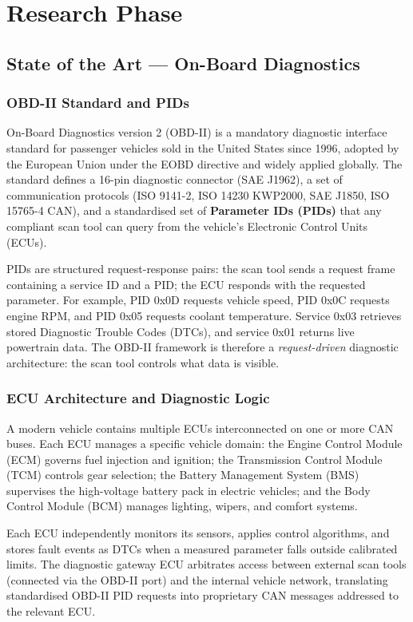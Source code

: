 \section{Research Phase}

\subsection{State of the Art --- On-Board Diagnostics}

\subsubsection*{OBD-II Standard and PIDs}

On-Board Diagnostics version 2 (OBD-II) is a mandatory diagnostic interface standard for passenger vehicles sold in the United States since 1996, adopted by the European Union under the EOBD directive and widely applied globally. The standard defines a 16-pin diagnostic connector (SAE J1962), a set of communication protocols (ISO 9141-2, ISO 14230 KWP2000, SAE J1850, ISO 15765-4 CAN), and a standardised set of \textbf{Parameter IDs (PIDs)} that any compliant scan tool can query from the vehicle's Electronic Control Units (ECUs).

PIDs are structured request-response pairs: the scan tool sends a request frame containing a service ID and a PID; the ECU responds with the requested parameter. For example, PID 0x0D requests vehicle speed, PID 0x0C requests engine RPM, and PID 0x05 requests coolant temperature. Service 0x03 retrieves stored Diagnostic Trouble Codes (DTCs), and service 0x01 returns live powertrain data. The OBD-II framework is therefore a \emph{request-driven} diagnostic architecture: the scan tool controls what data is visible.

\subsubsection*{ECU Architecture and Diagnostic Logic}

A modern vehicle contains multiple ECUs interconnected on one or more CAN buses. Each ECU manages a specific vehicle domain: the Engine Control Module (ECM) governs fuel injection and ignition; the Transmission Control Module (TCM) controls gear selection; the Battery Management System (BMS) supervises the high-voltage battery pack in electric vehicles; and the Body Control Module (BCM) manages lighting, wipers, and comfort systems.

Each ECU independently monitors its sensors, applies control algorithms, and stores fault events as DTCs when a measured parameter falls outside calibrated limits. The diagnostic gateway ECU arbitrates access between external scan tools (connected via the OBD-II port) and the internal vehicle network, translating standardised OBD-II PID requests into proprietary CAN messages addressed to the relevant ECU.

